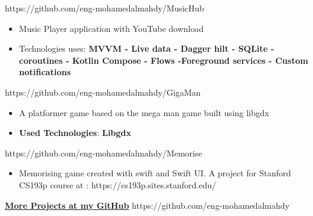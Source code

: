 \documentclass[10pt,a4paper,ragged2e,withhyper]{altacv}
\begin{document}
\begin{paracol}{1}
        {\cvrepo{|\faGithub\faAndroid}
        {https://github.com/eng-mohamedalmahdy/MusicHub}
        }{}{}
        \begin{itemize}
            \item \textbf{} Music Player application with YouTube download
            \item Technologies uses: \textbf{MVVM - Live data - Dagger hilt - SQLite - coroutines - Kotlin Compose - Flows -\linebreak Foreground services - Custom notifications}
        \end{itemize}
        \divider


        {\cvrepo{|\faGithub\faGamepad}
        {https://github.com/eng-mohamedalmahdy/GigaMan}}{}{}
        \begin{itemize}
            \item \textbf{}A platformer game based on the mega man game built using libgdx
            \item \textbf{Used Technologies}: \textbf{Libgdx}
        \end{itemize}
        \divider

        {\cvrepo{|\faGithub\faApple}
        {https://github.com/eng-mohamedalmahdy/Memorise}
        }{}{}
        \begin{itemize}
            \item \textbf{} Memorising game created with swift and Swift UI. \linebreak
            A project for Stanford CS193p course at : https://cs193p.sites.stanford.edu/
        \end{itemize}
        \divider

        \begin{center}
            \textbf{\Large \href{https://github.com/eng-mohamedalmahdy}{More Projects at my GitHub}}
            {\cvrepo{\faGithub}
            {https://github.com/eng-mohamedalmahdy}}{}{}
        \end{center}
        \divider
    \end{paracol}
\end{document}
